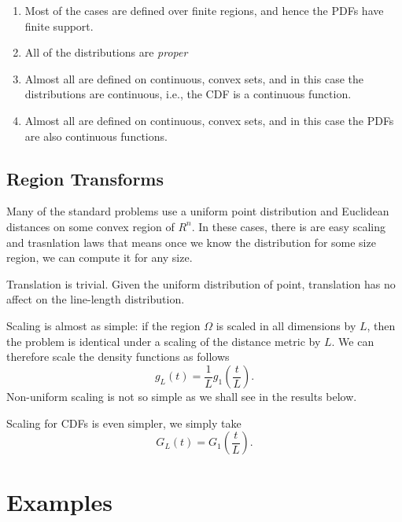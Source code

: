 \documentclass{article}
\begin{document}
\begin{enumerate}

\item Most of the cases are defined over finite regions, and hence the
  PDFs have finite support.

\item All of the distributions are {\em proper}

\item Almost all are defined on continuous, convex sets, and in this
  case the distributions are continuous, i.e., the CDF is a continuous
  function.

\item Almost all are defined on continuous, convex sets, and in this
  case the PDFs are also continuous functions.

\end{enumerate}

\subsection{Region Transforms}
\label{sec:scaling}

Many of the standard problems use a uniform point distribution and
Euclidean distances on some convex region of $R^n$. In these cases,
there is are easy scaling and trasnlation laws that means once we know
the distribution for some size region, we can compute it for any size.

Translation is trivial. Given the uniform distribution of point,
translation has no affect on the line-length distribution.

Scaling is almost as simple: if the region $\Omega$ is scaled in all
dimensions by $L$, then the problem is identical under a scaling of
the distance metric by $L$. We can therefore scale the density
functions as follows
\begin{equation}
   g_L(t) = \frac{1}{L} g_1 \left( \frac{t}{L} \right). 
\end{equation}
Non-uniform scaling is not so simple as we shall see in the results
below.

Scaling for CDFs is even simpler, we simply take
\begin{equation}
   G_L(t) = G_1 \left( \frac{t}{L} \right). 
\end{equation}


\section{Examples}
\label{sec:known}
\end{document}
